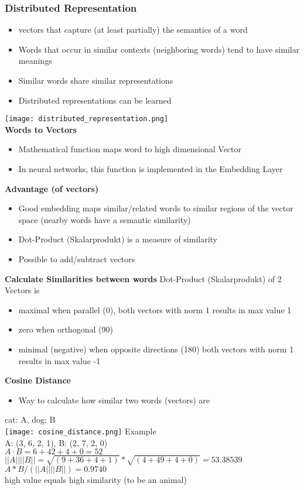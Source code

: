 \subsubsection{Distributed Representation}
\begin{itemize}
    \item vectors that capture (at least partially) the semantics of a word
    \item Words that occur in similar contexts (neighboring words) tend to have similar meanings
    \item Similar words share similar representations
    \item Distributed representations can be learned
\end{itemize}
\texttt{[image: distributed\_representation.png]}\\
\textbf{Words to Vectors}
\begin{itemize}
    \item Mathematical function maps word to high dimensional Vector
    \item In neural networks, this function is implemented in the Embedding Layer
\end{itemize}
\textbf{Advantage (of vectors)}
\begin{itemize}
    \item Good embedding maps similar/related words to similar regions of the vector space (nearby words have a semantic similarity)
    \item Dot-Product (Skalarprodukt) is a measure of similarity
    \item Possible to add/subtract vectors
\end{itemize}
\textbf{Calculate Similarities between words}
Dot-Product (Skalarprodukt) of 2 Vectors is
\begin{itemize}
    \item maximal when parallel (0\textdegree), both vectors with norm 1 results in max value 1
    \item zero when orthogonal (90\textdegree)
    \item minimal (negative) when opposite directions (180\textdegree) both vectors with norm 1 results in max value -1
\end{itemize}
\textbf{Cosine Distance}
\begin{itemize}
    \item Way to calculate how similar two words (vectors) are
\end{itemize}
cat: A, dog: B \\
\texttt{[image: cosine\_distance.png]}
Example \\
A: (3, 6, 2, 1), B: (2, 7, 2, 0) \\
$A \cdot B = 6 + 42 + 4 + 0 = 52$ \\
$|| A || || B || = \sqrt{(9 + 36 + 4 + 1)} * \sqrt{(4 + 49 + 4 + 0)} = 53.38539$ \\
$A * B / ( || A || || B ||) = 0.9740$ \\
high value equals high similarity (to be an animal)


